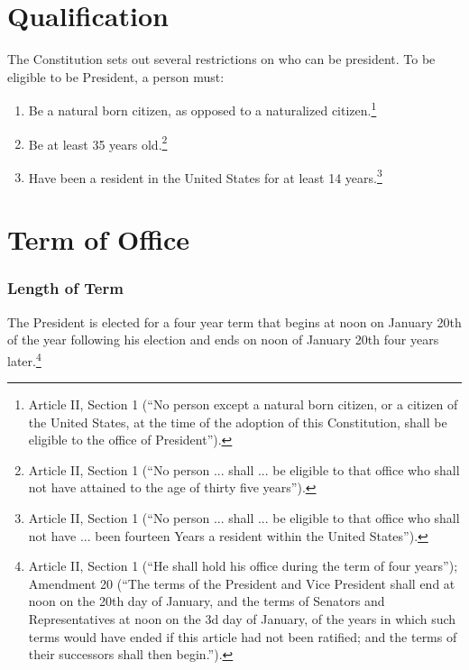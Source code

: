 \section{Qualification}
The Constitution sets out several restrictions on who can be president.  To be eligible to be President, a person must:

\begin{enumerate}
\item Be a natural born citizen, as opposed to a naturalized citizen.\footnote{Article II, Section 1 (``No person except a natural born citizen, or a citizen of the United States, at the time of the adoption of this Constitution, shall be eligible to the office of President'').}
\item Be at least 35 years old.\footnote{Article II, Section 1 (``No person ... shall ... be eligible to that office who shall not have attained to the age of thirty five years'').}
\item Have been a resident in the United States for at least 14 years.\footnote{Article II, Section 1 (``No person ... shall ... be eligible to that office who shall not have ... been fourteen Years a resident within the United States'').}
\end{enumerate}

\section{Term of Office}

\subsubsection{Length of Term}
The President is elected for a four year term that begins at noon on January 20th of the year following his election and ends on noon of January 20th four years later.\footnote{Article II, Section 1 (``He shall hold his office during the term of four years''); Amendment 20 (``The terms of the President and Vice President shall end at noon on the 20th day of January, and the terms of Senators and Representatives at noon on the 3d day of January, of the years in which such terms would have ended if this article had not been ratified; and the terms of their successors shall then begin.'').}

